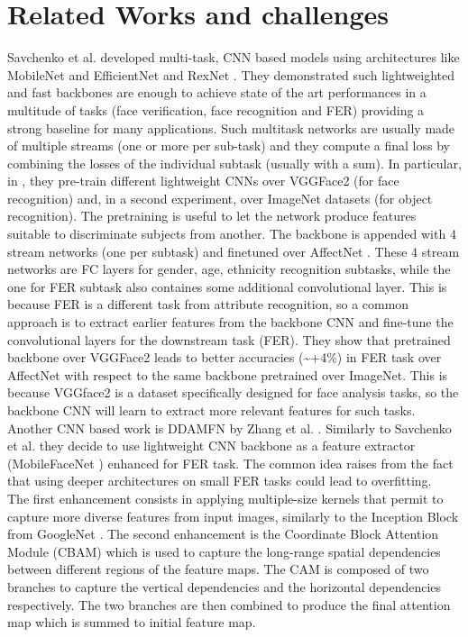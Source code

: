 \section{Related Works and challenges}
Savchenko et al. \cite{RW_7_EFF1}\cite{RW_7_EFF2} developed multi-task, CNN based models using architectures like MobileNet \cite{MobileNetv1} and EfficientNet \cite{EfficientNet} and RexNet \cite{RexNet}. They demonstrated such lightweighted and fast backbones are enough to achieve state of the art performances in a multitude of tasks (face verification, face recognition and FER) providing a strong baseline for many applications. Such multitask networks are usually made of multiple streams (one or more per sub-task) and they compute a final loss by combining the losses of the individual subtask (usually with a sum).
In particular, in \cite{RW_7_EFF2}, they pre-train different lightweight CNNs over VGGFace2 \cite{VGGFace2} (for face recognition) and, in a second experiment, over ImageNet \cite{ImageNet} datasets (for object recognition). The pretraining is useful to let the network produce features suitable to discriminate subjects from another. 
The backbone is appended with 4 stream networks (one per subtask) and finetuned over AffectNet \cite{AffectNet}. These 4 stream networks are FC layers for gender, age, ethnicity recognition subtasks, while the one for FER subtask also containes some additional convolutional layer. This is because FER is a different task from attribute recognition, so a common approach is to extract earlier features from the backbone CNN and fine-tune the convolutional layers for the downstream task (FER). They show that pretrained backbone over VGGFace2 leads to better accuracies (\textasciitilde +4\%) in FER task over AffectNet with respect to the same backbone pretrained over ImageNet. This is because VGGface2 is a dataset specifically designed for face analysis tasks, so the backbone CNN will learn to extract more relevant features for such tasks.\\

 Another CNN based work is DDAMFN by Zhang et al. \cite{RW_11_DDAMFN}. Similarly to Savchenko et al. they decide to use lightweight CNN backbone as a feature extractor (MobileFaceNet \cite{MobileFaceNet}) enhanced for FER task. The common idea raises from the fact that using deeper architectures on small FER tasks could lead to overfitting.\\
The first enhancement consists in applying multiple-size kernels that permit to capture more diverse features from input images, similarly to the Inception Block from GoogleNet \cite{Inception_block}. The second enhancement is the Coordinate Block Attention Module (CBAM)\cite{CBAM} which is used to capture the long-range spatial dependencies between different regions of the feature maps. The CAM is composed of two branches to capture the vertical dependencies and the horizontal dependencies respectively. The two branches are then combined to produce the final attention map which is summed to initial feature map.\\
 
